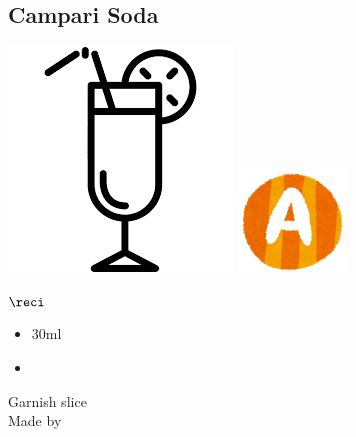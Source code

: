 \subsection{Campari Soda}
\vspace{-7mm}
\hspace{40mm}
\includegraphics[scale=.07]{cocktail_glass_tall.png}
\includegraphics[scale=.12]{capital_a.png}
\vspace{2.5mm}
\begin{itembox}[l]{\boldmath $\reci$}
\begin{itemize}
\setlength{\parskip}{0cm}
\setlength{\itemsep}{0cm}
\item \campari 30ml
\item \soda
\end{itemize}
\vspace{-4mm}
Garnish \orange slice\\
Made by \build
\end{itembox}
